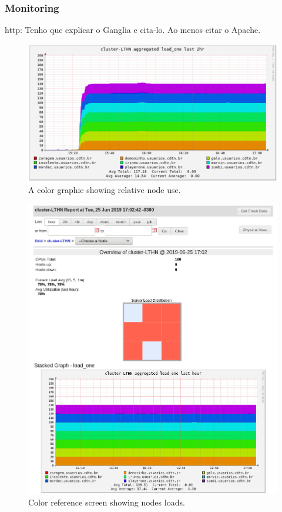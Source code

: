 \documentclass[twoside,a4paper,12pt,english]{inac19}
\begin{document}
\subsubsection{Monitoring}
\label{ssec:ganglia}

http: Tenho que explicar o Ganglia\cite{ganglia} e cita-lo. Ao menos citar o Apache\cite{apache}.

\begin{figure}[h] %
  \centering\includegraphics[scale=0.55]{images/ganglia_rainbow.png}
  \caption{A color graphic showing relative node use.}
  \label{fig:ganglia-rainbow}
\end{figure}

\begin{figure}[h] %
  \centering\includegraphics[scale=0.7]{images/ganglia_colors.png}
  \caption{Color reference screen showing nodes loads.}
  \label{fig:ganglia-colors}
\end{figure}
\end{document}

